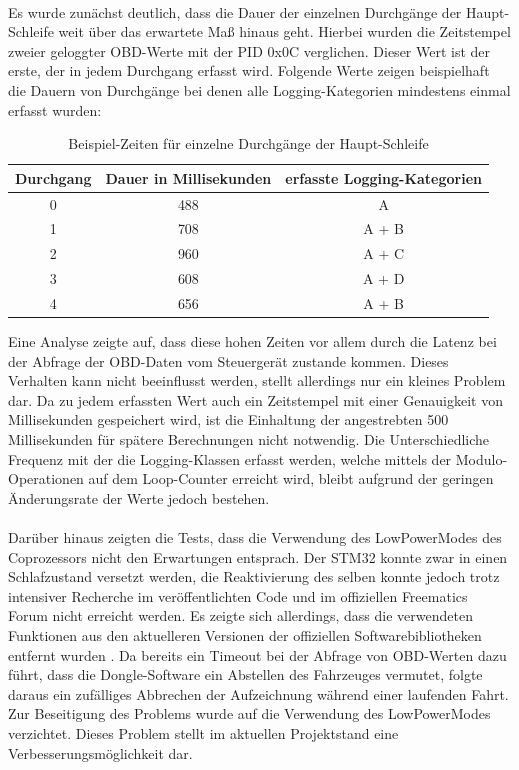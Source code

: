 \paragraph{}
Es wurde zunächst deutlich, dass die Dauer der einzelnen Durchgänge der Haupt-Schleife weit über das erwartete Maß hinaus geht. Hierbei wurden die Zeitstempel zweier geloggter OBD-Werte mit der PID 0x0C verglichen. Dieser Wert ist der erste, der in jedem Durchgang erfasst wird. Folgende Werte zeigen beispielhaft die Dauern von Durchgänge bei denen alle Logging-Kategorien mindestens einmal erfasst wurden:
\begin{table}
  \caption{Beispiel-Zeiten für einzelne Durchgänge der Haupt-Schleife}
  \label{tab:loopTimes}

  \begin{center}
    \begin{tabular}{|c|c|c|}
    \hline
      Durchgang & Dauer in Millisekunden & erfasste Logging-Kategorien\\ \hline
      0 & 488 & A\\ \hline
      1 & 708 & A + B\\ \hline
      2 & 960 & A + C\\ \hline
      3 & 608 & A + D\\ \hline
      4 & 656 & A + B\\ \hline
    \end{tabular}
  \end{center}
\end{table}
Eine Analyse zeigte auf, dass diese hohen Zeiten vor allem durch die Latenz bei der Abfrage der OBD-Daten vom Steuergerät zustande kommen. Dieses Verhalten kann nicht beeinflusst werden, stellt allerdings nur ein kleines Problem dar. Da zu jedem erfassten Wert auch ein Zeitstempel mit einer Genauigkeit von  Millisekunden gespeichert wird, ist die Einhaltung der angestrebten 500 Millisekunden für spätere Berechnungen nicht notwendig. Die Unterschiedliche Frequenz mit der die Logging-Klassen erfasst werden, welche mittels der Modulo-Operationen auf dem Loop-Counter erreicht wird, bleibt aufgrund der geringen Änderungsrate der Werte jedoch bestehen.
\paragraph{}
Darüber hinaus zeigten die Tests, dass die Verwendung des LowPowerModes des Coprozessors nicht den Erwartungen entsprach. Der STM32 konnte zwar in einen Schlafzustand versetzt werden, die Reaktivierung des selben konnte jedoch trotz intensiver Recherche im veröffentlichten Code und im offiziellen Freematics Forum nicht erreicht werden. Es zeigte sich allerdings, dass die verwendeten Funktionen aus den aktuelleren Versionen der offiziellen Softwarebibliotheken entfernt wurden \cite{freematicsRevFeb}. Da bereits ein Timeout bei der Abfrage von OBD-Werten dazu führt, dass die Dongle-Software ein Abstellen des Fahrzeuges vermutet, folgte daraus ein zufälliges Abbrechen der Aufzeichnung während einer laufenden Fahrt. Zur Beseitigung des Problems wurde auf die Verwendung des LowPowerModes verzichtet. Dieses Problem stellt im aktuellen Projektstand eine Verbesserungsmöglichkeit dar.
